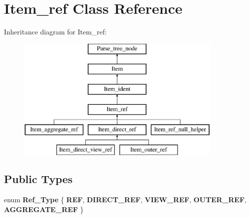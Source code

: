 \hypertarget{classItem__ref}{}\section{Item\+\_\+ref Class Reference}
\label{classItem__ref}
Inheritance diagram for Item\+\_\+ref\+:\begin{figure}[H]
\begin{center}
\leavevmode
\includegraphics[height=6.000000cm]{classItem__ref}
\end{center}
\end{figure}
\subsection*{Public Types}
\begin{DoxyCompactItemize}
\item 
\mbox{\label{classItem__ref_aa11b80702a29ba48ed99238bdf799e1a}} 
enum {\bfseries Ref\+\_\+\+Type} \{ \newline
{\bfseries R\+EF}, 
{\bfseries D\+I\+R\+E\+C\+T\+\_\+\+R\+EF}, 
{\bfseries V\+I\+E\+W\+\_\+\+R\+EF}, 
{\bfseries O\+U\+T\+E\+R\+\_\+\+R\+EF}, 
\newline
{\bfseries A\+G\+G\+R\+E\+G\+A\+T\+E\+\_\+\+R\+EF}
 \}
\end{DoxyCompactItemize}
